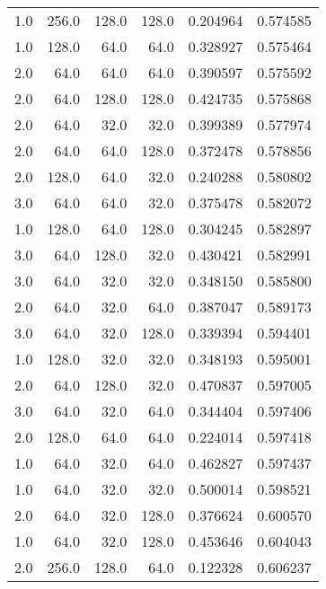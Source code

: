 \begin{longtable}{rrrrrr}
        1.0 &     256.0 &       128.0 &    128.0 &      0.204964 &    0.574585 \\
        1.0 &     128.0 &        64.0 &     64.0 &      0.328927 &    0.575464 \\
        2.0 &      64.0 &        64.0 &     64.0 &      0.390597 &    0.575592 \\
        2.0 &      64.0 &       128.0 &    128.0 &      0.424735 &    0.575868 \\
        2.0 &      64.0 &        32.0 &     32.0 &      0.399389 &    0.577974 \\
        2.0 &      64.0 &        64.0 &    128.0 &      0.372478 &    0.578856 \\
        2.0 &     128.0 &        64.0 &     32.0 &      0.240288 &    0.580802 \\
        3.0 &      64.0 &        64.0 &     32.0 &      0.375478 &    0.582072 \\
        1.0 &     128.0 &        64.0 &    128.0 &      0.304245 &    0.582897 \\
        3.0 &      64.0 &       128.0 &     32.0 &      0.430421 &    0.582991 \\
        3.0 &      64.0 &        32.0 &     32.0 &      0.348150 &    0.585800 \\
        2.0 &      64.0 &        32.0 &     64.0 &      0.387047 &    0.589173 \\
        3.0 &      64.0 &        32.0 &    128.0 &      0.339394 &    0.594401 \\
        1.0 &     128.0 &        32.0 &     32.0 &      0.348193 &    0.595001 \\
        2.0 &      64.0 &       128.0 &     32.0 &      0.470837 &    0.597005 \\
        3.0 &      64.0 &        32.0 &     64.0 &      0.344404 &    0.597406 \\
        2.0 &     128.0 &        64.0 &     64.0 &      0.224014 &    0.597418 \\
        1.0 &      64.0 &        32.0 &     64.0 &      0.462827 &    0.597437 \\
        1.0 &      64.0 &        32.0 &     32.0 &      0.500014 &    0.598521 \\
        2.0 &      64.0 &        32.0 &    128.0 &      0.376624 &    0.600570 \\
        1.0 &      64.0 &        32.0 &    128.0 &      0.453646 &    0.604043 \\
        2.0 &     256.0 &       128.0 &     64.0 &      0.122328 &    0.606237 \\

\end{longtable}
